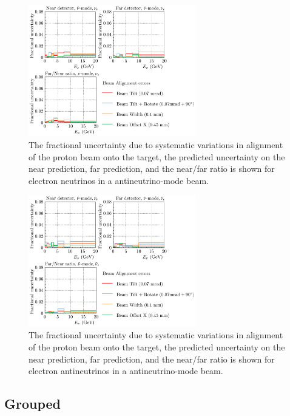 \documentclass{article}
\begin{document}
\begin{figure}
  \centering
  \includegraphics[width=0.65\textwidth]{plots/fracerrs/nubarmode_nue_BeamAlignment}
  \caption{The fractional uncertainty due to systematic variations in alignment of the proton beam onto the target, the predicted uncertainty on the near prediction, far prediction, and the near/far ratio is shown for electron neutrinos in a antineutrino-mode beam.}
  \label{fig:beamalign_nubar_nue}
\end{figure}

\begin{figure}
  \centering
  \includegraphics[width=0.65\textwidth]{plots/fracerrs/nubarmode_nuebar_BeamAlignment}
  \caption{The fractional uncertainty due to systematic variations in alignment of the proton beam onto the target, the predicted uncertainty on the near prediction, far prediction, and the near/far ratio is shown for electron antineutrinos in a antineutrino-mode beam.}
  \label{fig:beamalign_nubar_nuebar}
\end{figure}

\subsection{Grouped}
\end{document}
